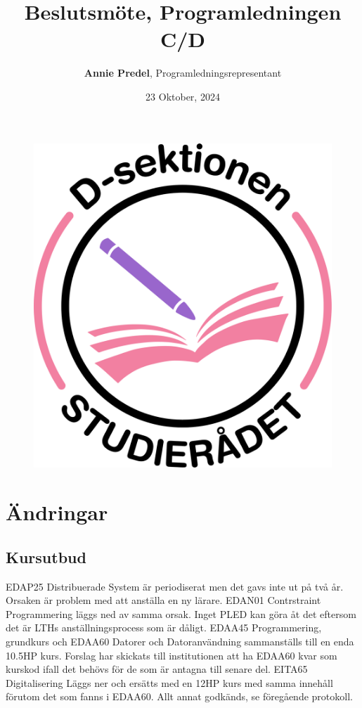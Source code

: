 \documentclass{article}
\begin{document}
	\begin{figure}[t]
		\vspace{-60pt}
		\includegraphics[width= 32 mm, center]{SRDDark.png}
	\end{figure}
	
	\title{\vspace{-30pt}Beslutsmöte, Programledningen C/D}
	\author{\textbf{Annie Predel}, Programledningsrepresentant}
	\date{23 Oktober, 2024}
	
	\maketitle
	
	
	
	
	\section{Ändringar}
	\subsection{Kursutbud}
	EDAP25 Distribuerade System är periodiserat men det gavs inte ut på två år. Orsaken är problem med att anställa en ny lärare.\newline
	EDAN01 Contrstraint Programmering läggs ned av samma orsak. Inget PLED kan göra åt det eftersom det är LTHs anställningsprocess som är dåligt.\newline
	EDAA45 Programmering, grundkurs och EDAA60 Datorer och Datoranvändning sammanställs till en enda 10.5HP kurs. Forslag har skickats till institutionen att ha EDAA60 kvar som kurskod ifall det behövs för de som är antagna till senare del.\newline
	EITA65 Digitalisering Läggs ner och ersätts med en 12HP kurs med samma innehåll förutom det som fanns i EDAA60.\newline
	Allt annat godkänds, se föregående protokoll.
	
\end{document}
